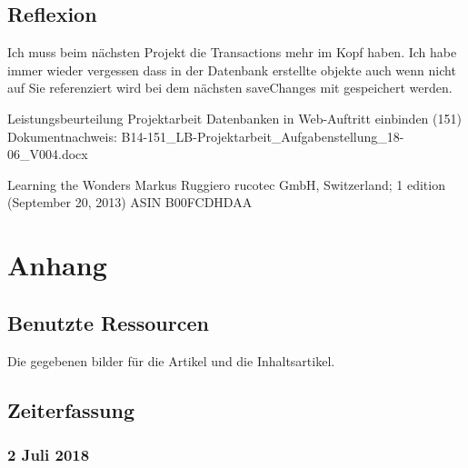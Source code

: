 \documentclass[a4paper, 11pt]{article}
\begin{document}
\subsection{Reflexion}

Ich muss beim nächsten Projekt die Transactions mehr im Kopf haben. Ich habe immer wieder vergessen dass in der Datenbank erstellte objekte auch wenn nicht auf Sie referenziert wird bei dem nächsten saveChanges mit gespeichert werden.

\begin{thebibliography}{9}
Leistungsbeurteilung Projektarbeit
Datenbanken in Web-Auftritt einbinden (151)
Dokumentnachweis: B14-151\_LB-Projektarbeit\_Aufgabenstellung\_18-06\_V004.docx

Learning the Wonders
Markus Ruggiero
rucotec GmbH, Switzerland; 1 edition (September 20, 2013)
ASIN B00FCDHDAA

\end{thebibliography}

\section{Anhang}

\subsection{Benutzte Ressourcen}

Die gegebenen bilder für die Artikel und die Inhaltsartikel.

\subsection{Zeiterfassung}

\subsubsection{2 Juli 2018}
\end{document}
